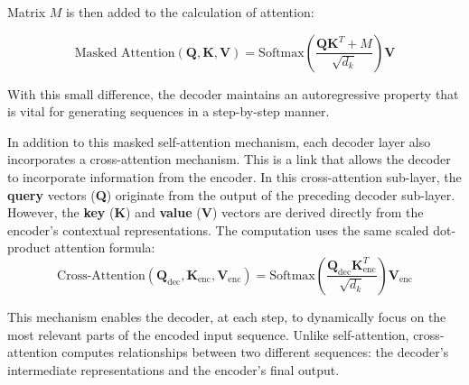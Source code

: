 Matrix $M$ is then added to the calculation of attention:

\begin{equation}
\text{Masked Attention}(\textbf{Q}, \textbf{K}, \textbf{V}) = \text{Softmax}\left(\frac{\textbf{Q}\textbf{K}^T + M}{\sqrt{d_k}}\right)\textbf{V}
\label{masked_att}
\end{equation}

With this small difference, the decoder maintains an autoregressive property that is vital for generating sequences in a step-by-step manner.


In addition to this masked self-attention mechanism, each decoder layer also incorporates a cross-attention mechanism. This is a link that allows the decoder to incorporate information from the encoder. In this cross-attention sub-layer, the \textbf{query} vectors (\textbf{Q}) originate from the output of the preceding decoder sub-layer. However, the \textbf{key} (\textbf{K}) and \textbf{value} (\textbf{V}) vectors are derived directly from the encoder’s contextual representations. The computation uses the same scaled dot-product attention formula:
\begin{equation}
\text{Cross-Attention}(\textbf{Q}_{\text{dec}}, \textbf{K}_{\text{enc}}, \textbf{V}_{\text{enc}}) = \text{Softmax}\left(\frac{\textbf{Q}_{\text{dec}}\textbf{K}_{\text{enc}}^T}{\sqrt{d_k}}\right)\textbf{V}_{\text{enc}}
\label{cross_att}
\end{equation}

This mechanism enables the decoder, at each step, to dynamically focus on the most relevant parts of the encoded input sequence. Unlike self-attention, cross-attention computes relationships between two different sequences: the decoder's intermediate representations and the encoder's final output.
\newline



